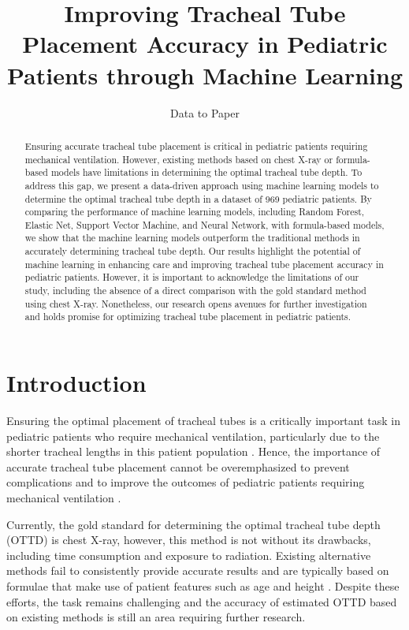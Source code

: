 \documentclass[11pt]{article}
\title{Improving Tracheal Tube Placement Accuracy in Pediatric Patients through Machine Learning}
\author{Data to Paper}
\begin{document}
\maketitle
\begin{abstract}
Ensuring accurate tracheal tube placement is critical in pediatric patients requiring mechanical ventilation. However, existing methods based on chest X-ray or formula-based models have limitations in determining the optimal tracheal tube depth. To address this gap, we present a data-driven approach using machine learning models to determine the optimal tracheal tube depth in a dataset of 969 pediatric patients. By comparing the performance of machine learning models, including Random Forest, Elastic Net, Support Vector Machine, and Neural Network, with formula-based models, we show that the machine learning models outperform the traditional methods in accurately determining tracheal tube depth. Our results highlight the potential of machine learning in enhancing care and improving tracheal tube placement accuracy in pediatric patients. However, it is important to acknowledge the limitations of our study, including the absence of a direct comparison with the gold standard method using chest X-ray. Nonetheless, our research opens avenues for further investigation and holds promise for optimizing tracheal tube placement in pediatric patients.
\end{abstract}
\section*{Introduction}

Ensuring the optimal placement of tracheal tubes is a critically important task in pediatric patients who require mechanical ventilation, particularly due to the shorter tracheal lengths in this patient population \cite{Baumeister1997EvaluationOP, Arnold1994ProspectiveRC}. Hence, the importance of accurate tracheal tube placement cannot be overemphasized to prevent complications and to improve the outcomes of pediatric patients requiring mechanical ventilation \cite{Traiber2009ProfileAC, Wolfler2011DailyPO}.

Currently, the gold standard for determining the optimal tracheal tube depth (OTTD) is chest X-ray, however, this method is not without its drawbacks, including time consumption and exposure to radiation. Existing alternative methods fail to consistently provide accurate results and are typically based on formulae that make use of patient features such as age and height \cite{Kerrey2009APC}. Despite these efforts, the task remains challenging and the accuracy of estimated OTTD based on existing methods is still an area requiring further research.
\end{document}
